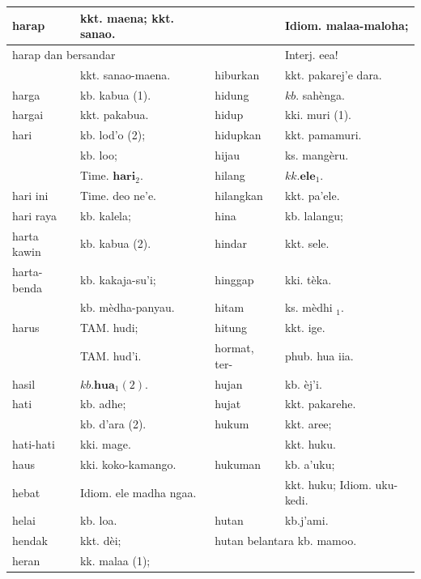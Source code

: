 \documentclass[10pt]{article}
\begin{document}
\begin{center}
\begin{tabular}{|l|l|l|l|}
\hline
harap & kkt. maena; kkt. sanao. &  & Idiom. malaa-maloha; \\
\hline
\multicolumn{2}{|l|}{harap dan bersandar} &  & Interj. eea! \\
\hline
 & kkt. sanao-maena. & hiburkan & kkt. pakarej'e dara. \\
\hline
harga & kb. kabua (1). & hidung & \(k b\). sahènga. \\
\hline
hargai & kkt. pakabua. & hidup & kki. muri (1). \\
\hline
hari & kb. lod'o (2); & hidupkan & kkt. pamamuri. \\
\hline
 & kb. loo; & hijau & ks. mangèru. \\
\hline
 & Time. \(\mathbf{h a r i}_{2}\). & hilang & \(k k . \mathbf{e l e}_{1}\). \\
\hline
hari ini & Time. deo ne'e. & hilangkan & kkt. pa'ele. \\
\hline
hari raya & kb. kalela; & hina & kb. lalangu; \\
\hline
harta kawin & kb. kabua (2). & hindar & kkt. sele. \\
\hline
harta-benda & kb. kakaja-su'i; & hinggap & kki. tèka. \\
\hline
 & kb. mèdha-panyau. & hitam & ks. mèdhi \({ }_{1}\). \\
\hline
harus & TAM. hudi; & hitung & kkt. ige. \\
\hline
 & TAM. hud'i. & hormat, ter- & phub. hua iia. \\
\hline
hasil & \(k b . \mathbf{h u a}_{1}(2)\). & hujan & kb. èj'i. \\
\hline
hati & kb. adhe; & hujat & kkt. pakarehe. \\
\hline
 & kb. d'ara (2). & hukum & kkt. aree; \\
\hline
hati-hati & kki. mage. &  & kkt. huku. \\
\hline
haus & kki. koko-kamango. & hukuman & kb. a'uku; \\
\hline
hebat & Idiom. ele madha ngaa. &  & kkt. huku; Idiom. uku-kedi. \\
\hline
helai & kb. loa. & hutan & kb.j'ami. \\
\hline
hendak & kkt. dèi; & \multicolumn{2}{|l|}{hutan belantara kb. mamoo.} \\
\hline
heran & kk. malaa (1); &  &  \\
\hline
\end{tabular}
\end{center}
\end{document}
